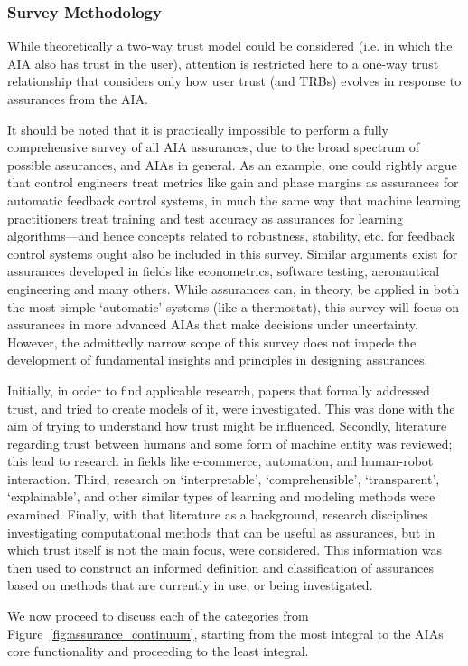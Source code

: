 \subsubsection*{Survey Methodology} \label{sec:methodology}
    While theoretically a two-way trust model could be considered (i.e. in which the AIA also has trust in the user), attention is restricted here to a one-way trust relationship that considers only how user trust (and TRBs) evolves in response to assurances from the AIA. 

    It should be noted that it is practically impossible to perform a fully comprehensive survey of all AIA assurances, due to the broad spectrum of possible assurances, and AIAs in general. As an example, one could rightly argue that control engineers treat metrics like gain and phase margins as assurances for automatic feedback control systems, in much the same way that machine learning practitioners treat training and test accuracy as assurances for learning algorithms---and hence concepts related to robustness, stability, etc. for feedback control systems ought also be included in this survey. Similar arguments exist for assurances developed in fields like econometrics, software testing, aeronautical engineering and many others. While assurances can, in theory, be applied in both the most simple `automatic' systems (like a thermostat), this survey will focus on assurances in more advanced AIAs that make decisions under uncertainty. However, the admittedly narrow scope of this survey does not impede the development of fundamental insights and principles in designing assurances.

    Initially, in order to find applicable research, papers that formally addressed trust, and tried to create models of it, were investigated. This was done with the aim of trying to understand how trust might be influenced. Secondly, literature regarding trust between humans and some form of machine entity was reviewed; this lead to research in fields like e-commerce, automation, and human-robot interaction. Third, research on `interpretable', `comprehensible', `transparent', `explainable', and other similar types of learning and modeling methods were examined. Finally, with that literature as a background, research disciplines investigating computational methods that can be useful as assurances, but in which trust itself is not the main focus, were considered. This information was then used to construct an informed definition and classification of assurances based on methods that are currently in use, or being investigated.
    
    We now proceed to discuss each of the categories from Figure~\ref{fig:assurance_continuum}, starting from the most integral to the AIAs core functionality and proceeding to the least integral.
